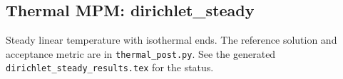 \subsection{Thermal MPM: dirichlet\_steady}
Steady linear temperature with isothermal ends. The reference solution and acceptance metric are in \texttt{thermal\_post.py}. See the generated \texttt{dirichlet\_steady\_results.tex} for the status.
